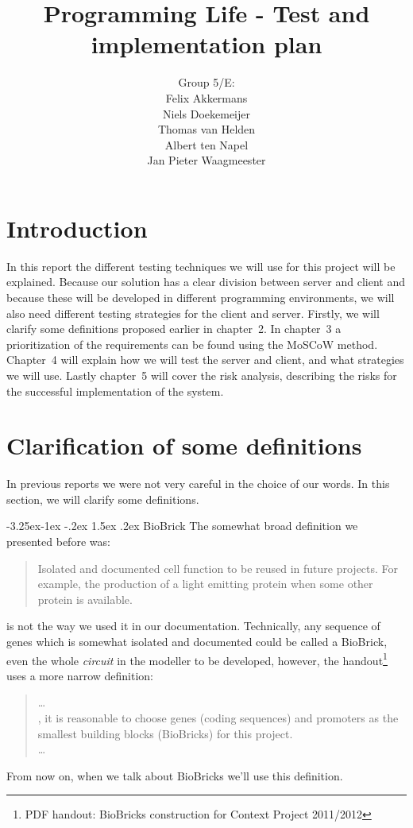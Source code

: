 \documentclass[a4paper]{article}
\title{Programming Life - Test and implementation plan }
\author{Group 5/E:\\
Felix Akkermans \\
Niels Doekemeijer \\
Thomas van Helden \\
Albert ten Napel \\
Jan Pieter Waagmeester}
\makeatletter
\renewcommand\paragraph{\@startsection{paragraph}{4}{\z@}%
  {-3.25ex\@plus -1ex \@minus -.2ex}%
  {1.5ex \@plus .2ex}%
  {\normalfont\normalsize\bfseries}}
\makeatother
\begin{document}
\maketitle

\vfill

\small{\tableofcontents}
\pagebreak

\section{Introduction}
In this report the different testing techniques we will use for this project will be explained. Because our solution has a clear division between server and client and because these will be developed in different programming environments, we will also need different testing strategies for the client and server. Firstly, we will clarify some definitions proposed earlier in chapter~2. In chapter~3 a prioritization of the requirements can be found using the MoSCoW method. Chapter~4 will explain how we will test the server and client, and what strategies we will use. Lastly chapter~5 will cover the risk analysis, describing the risks for the successful implementation of the system.

\section{Clarification of some definitions}
In previous reports we were not very careful in the choice of our words. In this section, we will clarify some definitions.

\paragraph{BioBrick}
The somewhat broad definition we presented before was:
\begin{quote}Isolated and documented cell function to be reused in future projects. For example, the production of a light emitting protein when some other protein is available.
\end{quote}
is not the way we used it in our documentation. Technically, any sequence of genes which is somewhat isolated and documented could be called a BioBrick, even the whole \textit{circuit} in the modeller to be developed, however, the handout\footnote{PDF handout: BioBricks construction for Context Project 2011/2012} uses a more narrow definition:
\begin{quote}
	\dots \\
	, it is reasonable to choose genes (coding sequences) and promoters as the smallest building blocks (BioBricks) for this project.\\ \dots
\end{quote}
From now on, when we talk about BioBricks we'll use this definition.
\end{document}
